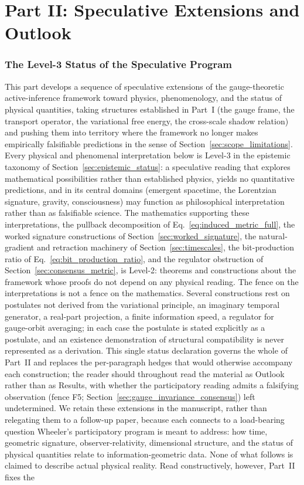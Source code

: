 \documentclass[11pt]{article}
\begin{document}
\part*{Part II: Speculative Extensions and Outlook}

\section{The Level-3 Status of the Speculative Program}\label{sec:part2_preamble}

This part develops a sequence of speculative extensions of the gauge-theoretic active-inference framework toward physics, phenomenology, and the status of physical quantities, taking structures established in Part~I (the gauge frame, the transport operator, the variational free energy, the cross-scale shadow relation) and pushing them into territory where the framework no longer makes empirically falsifiable predictions in the sense of Section~\ref{sec:scope_limitations}. Every physical and phenomenal interpretation below is Level-3 in the epistemic taxonomy of Section~\ref{sec:epistemic_status}: a speculative reading that explores mathematical possibilities rather than established physics, yields no quantitative predictions, and in its central domains (emergent spacetime, the Lorentzian signature, gravity, consciousness) may function as philosophical interpretation rather than as falsifiable science. The mathematics supporting these interpretations, the pullback decomposition of Eq.~\eqref{eq:induced_metric_full}, the worked signature constructions of Section~\ref{sec:worked_signature}, the natural-gradient and retraction machinery of Section~\ref{sec:timescales}, the bit-production ratio of Eq.~\eqref{eq:bit_production_ratio}, and the regulator obstruction of Section~\ref{sec:consensus_metric}, is Level-2: theorems and constructions about the framework whose proofs do not depend on any physical reading. The fence on the interpretations is not a fence on the mathematics. Several constructions rest on postulates not derived from the variational principle, an imaginary temporal generator, a real-part projection, a finite information speed, a regulator for gauge-orbit averaging; in each case the postulate is stated explicitly as a postulate, and an existence demonstration of structural compatibility is never represented as a derivation. This single status declaration governs the whole of Part~II and replaces the per-paragraph hedges that would otherwise accompany each construction; the reader should throughout read the material as Outlook rather than as Results, with whether the participatory reading admits a falsifying observation (fence F5; Section~\ref{sec:gauge_invariance_consensus}) left undetermined. We retain these extensions in the manuscript, rather than relegating them to a follow-up paper, because each connects to a load-bearing question Wheeler's participatory program is meant to address: how time, geometric signature, observer-relativity, dimensional structure, and the status of physical quantities relate to information-geometric data. None of what follows is claimed to describe actual physical reality. Read constructively, however, Part~II fixes the 
\end{document}
